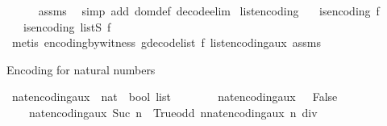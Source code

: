 \begin{isabellebody}
\ \ \ \ \isamarkupfalse%
\ assms\ \isamarkupfalse%
\ {\isacharparenleft}{\kern0pt}simp\ add{\isacharcolon}{\kern0pt}\ dom{\isacharunderscore}{\kern0pt}def\ decode{\isacharunderscore}{\kern0pt}elim{\isacharparenright}{\kern0pt}\isanewline
{}\isamarkupfalse%
%
\endisatagproof
{\isafoldproof}%
%
\isadelimproof
\isanewline
%
\endisadelimproof
\isanewline
{}\isamarkupfalse%
\ list{\isacharunderscore}{\kern0pt}encoding{\isacharcolon}{\kern0pt}\isanewline
\ \ \ {\isachardoublequoteopen}is{\isacharunderscore}{\kern0pt}encoding\ f{\isachardoublequoteclose}\isanewline
\ \ \ {\isachardoublequoteopen}is{\isacharunderscore}{\kern0pt}encoding\ {\isacharparenleft}{\kern0pt}list\isactrlsub S\ f{\isacharparenright}{\kern0pt}{\isachardoublequoteclose}\isanewline
%
\isadelimproof
\ \ %
\endisadelimproof
%
\isatagproof
{}\isamarkupfalse%
\ {\isacharparenleft}{\kern0pt}metis\ encoding{\isacharunderscore}{\kern0pt}by{\isacharunderscore}{\kern0pt}witness{\isacharbrackleft}{\kern0pt}\ g{\isacharequal}{\kern0pt}{\isachardoublequoteopen}decode{\isacharunderscore}{\kern0pt}list\ f{\isachardoublequoteclose}{\isacharbrackright}{\kern0pt}\ list{\isacharunderscore}{\kern0pt}encoding{\isacharunderscore}{\kern0pt}aux\ assms{\isacharparenright}{\kern0pt}%
\endisatagproof
{\isafoldproof}%
%
\isadelimproof
%
\endisadelimproof
%
\begin{isamarkuptext}%
Encoding for natural numbers%
\end{isamarkuptext}\isamarkuptrue%
\isamarkupfalse%
\ nat{\isacharunderscore}{\kern0pt}encoding{\isacharunderscore}{\kern0pt}aux\ {\isacharcolon}{\kern0pt}{\isacharcolon}{\kern0pt}\ {\isachardoublequoteopen}nat\ {\isasymRightarrow}\ bool\ list{\isachardoublequoteclose}\ \isanewline
\ \ \isanewline
\ \ \ \ {\isachardoublequoteopen}nat{\isacharunderscore}{\kern0pt}encoding{\isacharunderscore}{\kern0pt}aux\ {}\ {\isacharequal}{\kern0pt}\ {\isacharbrackleft}{\kern0pt}False{\isacharbrackright}{\kern0pt}{\isachardoublequoteclose}\ {\isacharbar}{\kern0pt}\isanewline
\ \ \ \ {\isachardoublequoteopen}nat{\isacharunderscore}{\kern0pt}encoding{\isacharunderscore}{\kern0pt}aux\ {\isacharparenleft}{\kern0pt}Suc\ n{\isacharparenright}{\kern0pt}\ {\isacharequal}{\kern0pt}\ True{\isacharhash}{\kern0pt}{\isacharparenleft}{\kern0pt}odd\ n{\isacharparenright}{\kern0pt}{\isacharhash}{\kern0pt}nat{\isacharunderscore}{\kern0pt}encoding{\isacharunderscore}{\kern0pt}aux\ {\isacharparenleft}{\kern0pt}n\ div\ {}{\isacharparenright}{\kern0pt}{\isachardoublequoteclose}\isanewline

\end{isabellebody}
